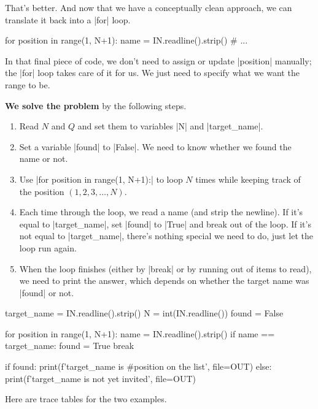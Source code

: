 That's better. And now that we have a conceptually clean approach, we can translate it
back into a \pycode|for| loop.

\begin{pythoncode}
  for position in range(1, N+1):
    name = IN.readline().strip()
    # ...
\end{pythoncode}

In that final piece of code, we don't need to assign or update \pycode|position| manually;
the \pycode|for| loop takes care of it for us. We just need to specify what we want the
range to be.

\textbf{We solve the problem} by the following steps.
\begin{enumerate}
  \item Read $N$ and $Q$ and set them to variables \pycode|N| and \pycode|target_name|.
  \item Set a variable \pycode|found| to \pycode|False|. We need to know whether we found
    the name or not.
  \item Use \pycode|for position in range(1, N+1):| to loop $N$ times while keeping track
    of the position $(1,2,3,\dots,N)$.
  \item Each time through the loop, we read a name (and strip the newline). If it's equal
    to \pycode|target_name|, set \pycode|found| to \pycode|True| and break out of the
    loop. If it's not equal to \pycode|target_name|, there's nothing special we need to
    do, just let the loop run again.
  \item When the loop finishes (either by \pycode|break| or by running out of items to
    read), we need to print the answer, which depends on whether the target name was
    \pycode|found| or not.
\end{enumerate}

\Solution

\begin{pythoncode}
  target_name = IN.readline().strip()
  N = int(IN.readline())
  found = False

  for position in range(1, N+1):
    name = IN.readline().strip()
    if name == target_name:
      found = True
      break

  if found:
    print(f'{target_name} is #{position} on the list', file=OUT)
  else:
    print(f'{target_name} is not yet invited', file=OUT)
\end{pythoncode}

\bigskip
Here are trace tables for the two examples.
\medskip

